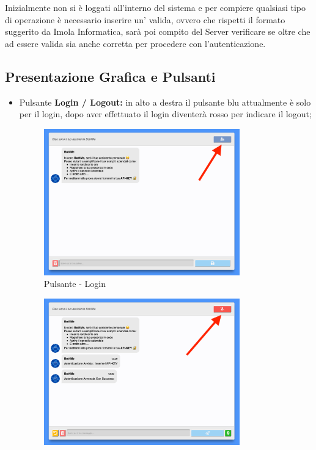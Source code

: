 Inizialmente non si è loggati all'interno del sistema e per compiere qualsiasi tipo di operazione è necessario inserire un' valida, ovvero che rispetti il formato suggerito da Imola Informatica, sarà poi compito del Server verificare se oltre che ad essere valida sia anche corretta per procedere con l'autenticazione. 

\subsection{Presentazione Grafica e Pulsanti}
\begin{itemize}
    \item Pulsante \textbf{Login / Logout:} in alto a destra il pulsante blu attualmente è solo per il login, dopo aver effettuato il login diventerà rosso per indicare il logout;
        \begin{figure}[H]
            \centering\includegraphics[width=0.8\textwidth, height=0.7\textheight, keepaspectratio]{images/schermata_pulsante_login.png}
            \caption{Pulsante - Login}
        \end{figure}
        \begin{figure}[H]
            \centering\includegraphics[width=0.8\textwidth, height=0.7\textheight, keepaspectratio]{images/schermata_pulsante_logout.png}

\end{figure}
\end{itemize}
